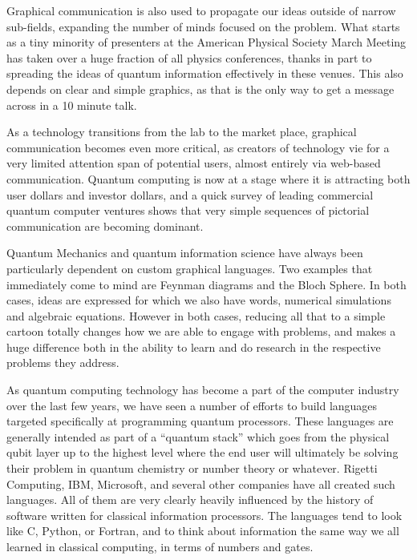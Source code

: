 \documentclass[11pt]{article}
\begin{document}
    Graphical communication is also used to propagate our ideas outside of narrow sub-fields, expanding the number of minds focused on the problem.  What starts as a tiny minority of presenters at the American Physical Society March Meeting has taken over a huge fraction of all physics conferences, thanks in part to spreading the ideas of quantum information effectively in these venues.  This also depends on clear and simple graphics, as that is the only way to get a message across in a 10 minute talk.  


    As a technology transitions from the lab to the market place, graphical communication becomes even more critical, as creators of technology vie for a very limited attention span of potential users, almost entirely via web-based communication.  Quantum computing is now at a stage where it is attracting both user dollars and investor dollars, and a quick survey of leading commercial quantum computer ventures shows that very simple sequences of pictorial communication are becoming dominant.    


    Quantum Mechanics and quantum information science have always been particularly dependent on custom graphical languages.  Two examples that immediately come to mind are Feynman diagrams and the Bloch Sphere.  In both cases, ideas are expressed for which we also have words, numerical simulations and algebraic equations.  However in both cases, reducing all that to a simple cartoon totally changes how we are able to engage with problems, and makes a huge difference both in the ability to learn and do research in the respective problems they address.

    As quantum computing technology has become a part of the computer industry over the last few years, we have seen a number of efforts to build languages targeted specifically at programming quantum processors.  These languages are generally intended as part of a ``quantum stack'' which goes from the physical qubit layer up to the highest level where the end user will ultimately be solving their problem in quantum chemistry or number theory or whatever.  Rigetti Computing, IBM, Microsoft, and several other companies have all created such languages.  All of them are very clearly heavily influenced by the history of software written for classical information processors. The languages tend to look like C, Python, or Fortran, and to think about information the same way we all learned in classical computing, in terms of numbers and gates.  
\end{document}
